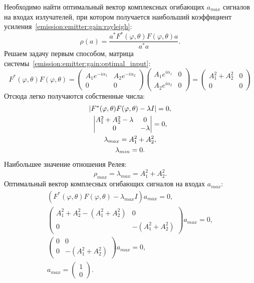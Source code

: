 Необходимо найти оптимальный вектор комплексных огибающих $a_{max}$ сигналов на входах излучателей, при котором получается наибольший коэффициент
усиления~\eqref{emission:emitter:gain:rayleigh}:
\[
    \rho(a)
    = \frac{a^*F^*(\varphi, \theta) F(\varphi, \theta) a}{a^*a}.
\]
Решаем задачу первым способом, матрица системы~\eqref{emission:emitter:gain:optimal_input}:
\[
    F^*(\varphi, \theta) F(\varphi, \theta)
    =
    \begin{pmatrix}
        A_1 e^{-i \alpha_1} & A_2 e^{-i \alpha_2} \\
        0                   & 0
    \end{pmatrix}
    \begin{pmatrix}
        A_1 e^{i \alpha_1} & 0 \\
        A_2 e^{i \alpha_2} & 0
    \end{pmatrix}
    =
    \begin{pmatrix}
        A_1^2 + A_2^2 & 0 \\
        0             & 0
    \end{pmatrix}
\]
Отсюда легко получаются собственные числа:
\begin{gather*}
    \left | F^*(\varphi, \theta) F(\varphi, \theta) - \lambda I \right | = 0 , \\
    \begin{vmatrix}
        A_1^2 + A_2^2 - \lambda & 0         \\
        0                       & - \lambda
    \end{vmatrix}
    = 0 , \\
    \lambda_{max} = A_1^2 + A_2^2 , \\
    \lambda_{min} = 0 .
\end{gather*}
Наибольшее значение отношения Релея:
\[
    \rho_{max} = \lambda_{max} = A_1^2 + A_2^2 .
\]
Оптимальный вектор комплесных огибающих сигналов на входах $a_{max}$:
\begin{gather*}
    ( F^*(\varphi, \theta) F(\varphi, \theta) - \lambda_{max} I ) a_{max} = 0 , \\
    \begin{pmatrix}
        A_1^2 + A_2^2 - (A_1^2 + A_2^2) & 0                 \\
        0                               & - (A_1^2 + A_2^2)
    \end{pmatrix}
    a_{max} = 0 , \\
    \begin{pmatrix}
        0 & 0                 \\
        0 & - (A_1^2 + A_2^2)
    \end{pmatrix}
    a_{max} = 0 , \\
    a_{max}
    = \begin{pmatrix}
        1 \\
        0
    \end{pmatrix} .
\end{gather*}
